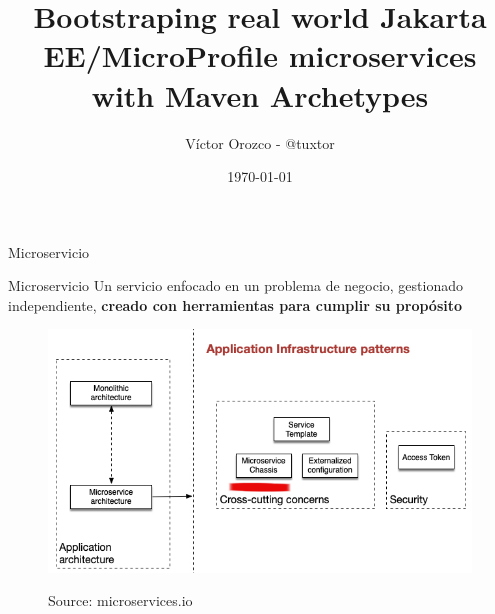 \documentclass[aspectratio=169]{beamer}
\title{Bootstraping real world Jakarta EE/MicroProfile microservices with Maven Archetypes}
\author{Víctor Orozco - @tuxtor}
\institute{Software architect}
\date{\today}
\begin{document}
{
    \frame{\titlepage}
}






\begin{frame}{Microservicio}

\begin{exampleblock}{Microservicio}
Un servicio enfocado en un problema de negocio, gestionado independiente, \textbf{creado con herramientas para cumplir su propósito}
\end{exampleblock}

\begin{figure}
\centering
\includegraphics[width=0.5\linewidth]{Images/chassis}
\label{fig:chassis}
\caption{Source: microservices.io}
\end{figure}


\end{frame}
\end{document}
